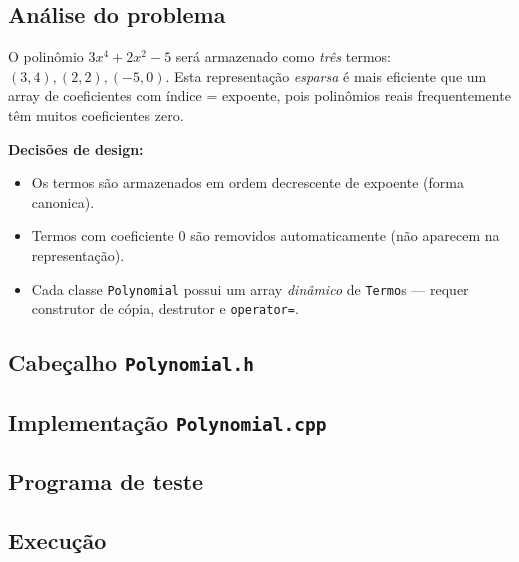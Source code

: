 \documentclass[11pt,a4paper]{article}
\begin{document}
\subsection*{An\'alise do problema}

O polin\^omio $3x^4 + 2x^2 - 5$ ser\'a armazenado como \emph{tr\^es} termos: $(3, 4), (2, 2), (-5, 0)$. Esta representa\c{c}\~ao \emph{esparsa} \'e mais eficiente que um array de coeficientes com \'indice = expoente, pois polin\^omios reais frequentemente t\^em muitos coeficientes zero.

\textbf{Decis\~oes de design:}

\begin{itemize}[leftmargin=*,itemsep=0pt]
  \item Os termos s\~ao armazenados em ordem decrescente de expoente (forma canonica).
  \item Termos com coeficiente 0 s\~ao removidos automaticamente (n\~ao aparecem na representa\c{c}\~ao).
  \item Cada classe \texttt{Polynomial} possui um array \emph{din\^amico} de \texttt{Termo}s --- requer construtor de c\'opia, destrutor e \texttt{operator=}.
\end{itemize}

\subsection*{Cabe\c{c}alho \texttt{Polynomial.h}}



\subsection*{Implementa\c{c}\~ao \texttt{Polynomial.cpp}}



\subsection*{Programa de teste}



\subsection*{Execu\c{c}\~ao}
\end{document}
